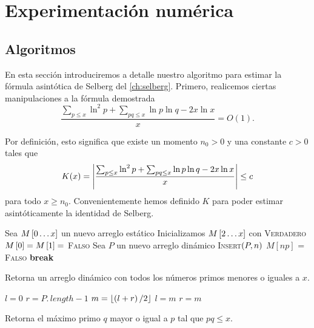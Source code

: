 \setlength{\headheight}{14.61858pt}
\pagestyle{fancy}

\chapter[Experimentaci\'on num\'erica]
{Experimentaci\'on num\'erica}
\label{ch:algorithms}

\vspace*{1cm}

\section{Algoritmos}
En esta secci\'on introduciremos a detalle nuestro algoritmo
para estimar la f\'ormula asint\'otica de Selberg del \cref{ch:selberg}.
Primero, realicemos ciertas manipulaciones a la f\'ormula demostrada
\[
  \frac{\sum_{p \leq x} \ln^2 p + \sum_{pq \leq x} \ln p \ln q - 2x\ln x}{x} = O(1).
\]

Por definici\'on, esto significa que existe
un momento \(n_0 > 0\)
y una constante \(c > 0\)
tales que
\[
  K(x)
  = \left\lvert \frac{\sum_{p \leq x} \ln^2 p
  + \sum_{pq \leq x} \ln p \ln q
  - 2x\ln x}{x} \right\rvert
  \leq c
\]
para todo \(x \geq n_0\).
Convenientemente hemos definido \(K\)
para poder estimar asint\'oticamente la identidad de Selberg.

\begin{algorithm}[H]
    \SetAlgoLined
    \DontPrintSemicolon
     {
        Sea \(M\left[ 0 \dots x \right]\) un nuevo arreglo est\'atico\;
        Inicializamos \(M\left[ 2 \dots x \right]\) con \textsc{Verdadero}\;
        \(M\left[ 0 \right] = M\left[ 1 \right] = \) \textsc{Falso}\;
        Sea \(P\) un nuevo arreglo din\'amico\;
         {
             {
                \textsc{Insert}\(\left( P, n \right)\)\;
            }
             {
                \(M[np]\) = \textsc{Falso}\;
                 {
                    \textbf{break}\;
                }
            }
        }
    }
    \caption{Retorna un arreglo din\'amico con todos los n\'umeros primos menores o iguales a \(x\).}
\end{algorithm}

\begin{algorithm}[H]
    \SetAlgoLined
    \DontPrintSemicolon
     {
        \(l = 0\)\;
        \(r = P.\,length - 1\)\;
         {
        }
         {
        }
         {
            \(m = \left\lfloor \left( l + r \right) / 2 \right\rfloor\)\;
             {
                \(l = m\)\;
            }
            {
                \(r = m\)\;
            }
        }
    }
    \caption{Retorna el m\'aximo primo \(q\) mayor o igual a \(p\) tal que \(pq \leq x\).}
\end{algorithm}

